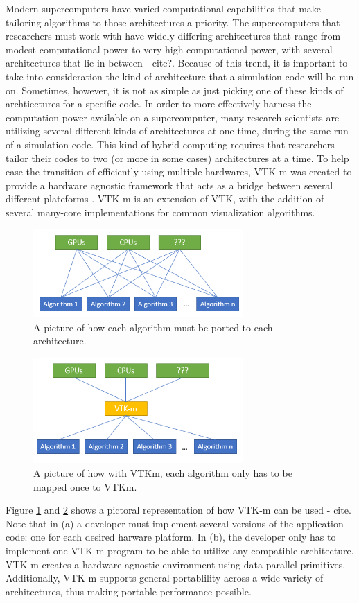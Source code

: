 \documentclass{IEEEtran}
\begin{document}
%
Modern supercomputers have varied computational capabilities that make tailoring algorithms to those architectures a priority.
%
The supercomputers that researchers must work with have widely differing architectures that range from modest computational power to very high computational power, with several architectures that lie in between - cite?.
%
Because of this trend, it is important to take into consideration the kind of architecture that a simulation code will be run on. 
%
Sometimes, however, it is not as simple as just picking one of these kinds of archtiectures for a specific code.
%
In order to more effectively harness the computation power available on a supercomputer, many research scientists are utilizing several different kinds of architectures at one time, during the same run of a simulation code.
%
This kind of hybrid computing requires that researchers tailor their codes to two (or more in some cases)  architectures at a time.
%
To help ease the transition of efficiently using multiple hardwares, VTK-m was created to provide a hardware agnostic framework that acts as a bridge between several different plateforms \cite{Moreland16}.
%
VTK-m is an extension of VTK, with the addition of several many-core implementations for common visualization algorithms.
%
\begin{figure}
  \includegraphics[width=8cm]{images/vtkm1.PNG}
  \caption{A picture of how each algorithm must be ported to each architecture.}
  \label{fig:vtkm1}
\end{figure}
%
\begin{figure}
  \includegraphics[width=8cm]{images/vtkm2.PNG}
  \caption{A picture of how with VTKm, each algorithm only has to be mapped once to VTKm.}
  \label{fig:vtkm2}
\end{figure}
%
Figure \ref{fig:vtkm1} and \ref{fig:vtkm2} shows a pictoral representation of how VTK-m can be used - cite. 
%
Note that in (a) a developer must implement several versions of the application code: one for each desired harware platform.
%
In (b), the developer only has to implement one VTK-m program to be able to utilize any compatible architecture.
%
VTK-m creates a hardware agnostic environment using data parallel primitives.
%
Additionally, VTK-m supports general portablility across a wide variety of architectures, thus making portable performance possible.
\end{document}
